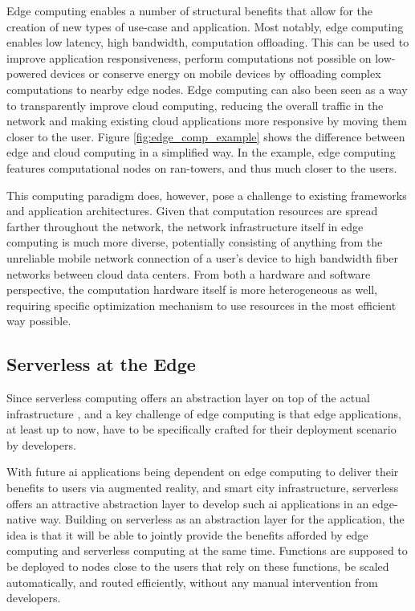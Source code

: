 Edge computing enables a number of structural benefits that allow for the creation of new types of use-case and application.
Most notably, edge computing enables low latency, high bandwidth, computation offloading.
This can be used to improve application responsiveness, perform computations not possible on low-powered devices or conserve energy on mobile devices by offloading complex computations to nearby edge nodes\cite{abbasMobileEdgeComputing2018b}.
Edge computing can also been seen as a way to transparently improve cloud computing, reducing the overall traffic in the network and making existing cloud applications more responsive by moving them closer to the user\cite{satyanarayananEmergenceEdgeComputing2017}.
Figure \ref{fig:edge_comp_example} shows the difference between edge and cloud computing in a simplified way.
In the example, edge computing features computational nodes on \gls{ran}-towers, and thus much closer to the users.


This computing paradigm does, however, pose a challenge to existing frameworks and application architectures.
Given that computation resources are spread  farther throughout the network, the network infrastructure itself in edge computing is much more diverse\cite{shiEdgeComputingVisionChallenges2016}, potentially consisting of anything from the unreliable mobile network connection of a user's device to high bandwidth fiber networks between cloud data centers.
From both a hardware and software perspective, the computation hardware itself is more heterogeneous as well, requiring specific optimization mechanism to use resources in the most efficient way possible\cite{abbasMobileEdgeComputing2018b}.

\subsection{Serverless at the Edge}
Since serverless computing offers an abstraction layer on top of the actual infrastructure \cite{jonasCloudProgrammingSimplified2019}, and a key challenge of edge computing is that edge applications, at least up to now, have to be specifically crafted for their deployment scenario by developers\cite{shiPromiseEdgeComputing2016}.

With future \gls{ai} applications being dependent on edge computing to deliver their benefits to users via augmented reality, and smart city infrastructure\cite{rauschEdgeIntelligenceConvergence2019}, serverless offers an attractive abstraction layer to develop such \gls{ai} applications in an edge-native way.
Building on serverless as an abstraction layer for the application, the idea is that it will be able to jointly provide the benefits afforded by edge computing and serverless computing at the same time.
Functions are supposed to be deployed to nodes close to the users that rely on these functions, be scaled automatically, and routed efficiently, without any manual intervention from developers.

